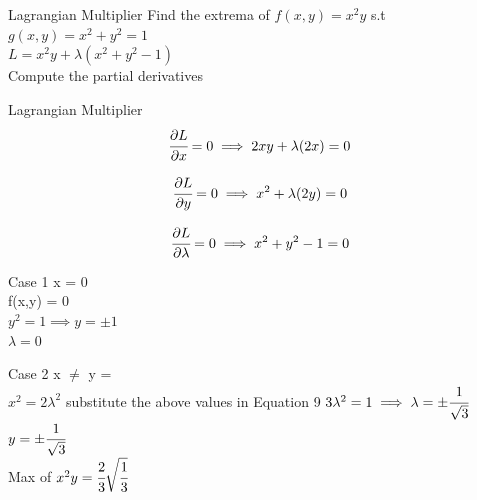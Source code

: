\documentclass{beamer}
\begin{document}
\begin{frame}{Lagrangian Multiplier}
    Find the extrema of $f(x,y) =x^{2}y$ s.t $g(x,y)=x^{2}+y^{2} = 1$ \\
    \vspace{1em}
    $L = x^{2}y + \lambda (x^{2} + y^{2} - 1)$\\
    \vspace{1em}
    Compute the partial derivatives
\end{frame}

\begin{frame}{Lagrangian Multiplier}
    \begin{equation}
        \cfrac{\partial L}{\partial x} = 0 \implies 2xy + \lambda(2x) = 0
    \end{equation}
    
    \begin{equation}
        \cfrac{\partial L}{\partial y} = 0 \implies x^{2} + \lambda(2y) = 0
    \end{equation}
    
    \begin{equation}
        \cfrac{\partial L}{\partial \lambda} = 0 \implies x^{2} + y^{2} - 1 = 0
    \end{equation}
\end{frame}

\begin{frame}{Case 1}
    x = 0\\
    \vspace{1em}
    f(x,y) = 0\\
    \vspace{1em}
    $y^{2} = 1 \implies y= \pm 1$\\
    \vspace{1em}
    $\lambda = 0$
\end{frame}

\begin{frame}{Case 2}
    x $\neq$  \implies y = \lambda\\
    \vspace{1em}
    $x^{2} = 2\lambda^{2}$ substitute the above values in Equation 9
    \vspace{1em}
    $3\lambda^{2} = 1 \implies \lambda = \pm \cfrac{1}{\sqrt{3}}$\\
    \vspace{1em}
    $y = \pm \cfrac{1}{\sqrt{3}}$\\
    \vspace{1em}
    Max of $x^{2}y = \cfrac{2}{3} \sqrt{\cfrac{1}{3}}$\\
\end{frame}
\end{document}
